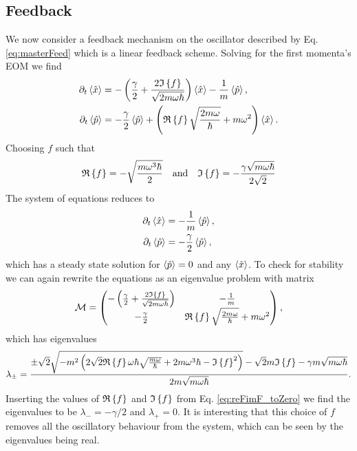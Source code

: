 \subsection{Feedback}
We now consider a feedback mechanism on the oscillator described by Eq. \eqref{eq:masterFeed} which is a linear feedback scheme. Solving for the first momenta's EOM we find 
\begin{align}
    \partial_t\expval{\hat{x}} &= - \left(\frac{\gamma}{2} + \frac{2 \mathfrak{I}\left\{f\right\}}{\sqrt{2 m \omega \hbar}} \right)\expval{\hat{x}} - \frac{1}{m} \expval{\hat{p}},\\
    \partial_t\expval{\hat{p}} &= -\frac{\gamma}{2}\expval{\hat{p}} + \left(\mathfrak{R}\left\{f\right\} \sqrt{\frac{2 m \omega}{\hbar}} + m \omega^2 \right) \expval{\hat{x}}.
\end{align}
Choosing $f$ such that
\begin{equation}
    \mathfrak{R}\left\{f\right\} = - \sqrt{\frac{m \omega^3 \hbar}{2}} \quad \text{and} \quad \mathfrak{I}\left\{f\right\} = -\frac{\gamma\sqrt{m\omega\hbar}}{2\sqrt{2}} \label{eq:reFimF_toZero}
\end{equation}
The system of equations reduces to
\begin{align}
    \partial_t\expval{\hat{x}} &= - \frac{1}{m} \expval{\hat{p}},\\
    \partial_t\expval{\hat{p}} &= -\frac{\gamma}{2} \expval{\hat{p}},
\end{align}
which has a steady state solution for $\expval{\hat{p}} = 0$ and any $\expval{\hat{x}}$. To check for stability we can again rewrite the equations as an eigenvalue problem with matrix
\begin{equation}
    \mathcal{M} = 
    \begin{pmatrix}
        - \left(\frac{\gamma}{2} + \frac{2 \mathfrak{I}\left\{f\right\}}{\sqrt{2 m \omega \hbar}} \right) & - \frac{1}{m} \\
        -\frac{\gamma}{2} & \mathfrak{R}\left\{f\right\} \sqrt{\frac{2 m \omega}{\hbar}} + m \omega^2
    \end{pmatrix},
\end{equation}
which has eigenvalues
\begin{equation}
    \lambda_\pm = \frac{\pm \sqrt{2} \sqrt{ -m^2 \left( 2 \sqrt{2} \mathfrak{R}\left\{f\right\} \omega \hbar \sqrt{\frac{m\omega}{\hbar}} + 2 m \omega^3 \hbar - \mathfrak{I}\left\{f\right\}^2 \right) } -\sqrt{2} m \mathfrak{I}\left\{f\right\} - \gamma m \sqrt{m \omega \hbar} }{ 2 m \sqrt{ m \omega \hbar}}.
\end{equation}
Inserting the values of $\mathfrak{R}\left\{f\right\}$ and $\mathfrak{I}\left\{f\right\}$ from Eq. \eqref{eq:reFimF_toZero} we find the eigenvalues to be $\lambda_- = -\gamma /2$ and $\lambda_+ = 0$. It is interesting that this choice of $f$ removes all the oscillatory behaviour from the system, which can be seen by the eigenvalues being real.

